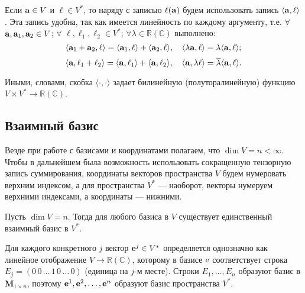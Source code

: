 Если $\mathbf{a}\in V$ и $\ell \in V^{*}$, то наряду с записью $\ell (\mathbf{a})$
будем использовать запись $\langle \mathbf{a}, \ell \rangle$. Эта запись удобна, так как имеется 
линейность по каждому аргументу, т.е. $\forall$ $\mathbf{a}, \mathbf{a}_1, \mathbf{a}_2 \in V$;
$\forall$ $\ell,  \ell _1, \ell _2 \in V^{*}$; $\forall \lambda \in \mathbb{R} (\mathbb{C})$ выполнено:   
$$\langle \mathbf{a}_1+ \mathbf{a}_2, \ell \rangle = \langle \mathbf{a}_1, \ell \rangle + \langle \mathbf{a}_2, 
\ell \rangle, \,\,\,\,\,\,
\langle \lambda \mathbf{a}, \ell \rangle = \lambda  \langle \mathbf{a}, \ell \rangle;$$
$$\langle  \mathbf{a}, \ell_1+ \ell_2 \rangle =  \langle \mathbf{a}, \ell_1 \rangle + \langle \mathbf{a}, \ell_2 \rangle, \,\,\,\,\,\,
\langle \mathbf{a}, \lambda  \ell \rangle = \overline{\lambda } \langle \mathbf{a}, \ell \rangle.$$

Иными, словами, скобка $\langle \cdot, \cdot \rangle$ задает билинейную (полуторалинейную) функцию
$V\times V^{*} \to \mathbb{R} (\mathbb{C})$.

\subsection{Взаимный базис}
Везде при работе с базисами и координатами полагаем, что 
$\dim V = n<\infty $. 
Чтобы в дальнейшем была возможность использовать сокращенную тензорную запись суммирования, 
координаты векторов пространства $V$ будем нумеровать верхним индексом,
а для пространства $V^{*}$ --- наоборот, векторы нумеруем верхними индексами, а координаты --- нижними.



\begin{predl}\label{p8_4_00}
Пусть $\dim V = n$. Тогда для любого базиса в $V$ существует единственный взаимный базис
в $V^{*}$.
\end{predl}
\dok Для каждого конкретного $j$ вектор $\mathbf{e}^j\in V^*$ определяется %
однозначно как линейное отображение $V\to \mathbb{R} (\mathbb{C})$, которому в базисе $\mathrm{e}$ соответствует строка $E_j=(0\, 0\, \ldots \, 1\,  0 \, \ldots \, 0)$ (единица на $j$-м месте). 
Строки $E_1, \ldots, E_n$ образуют базис в $\mathbf{M}_{1\times n}$, поэтому 
$\mathbf{e}^1, \mathbf{e}^2, \ldots , \mathbf{e}^n$ образуют базис пространства $V^{*}$.
\edok

